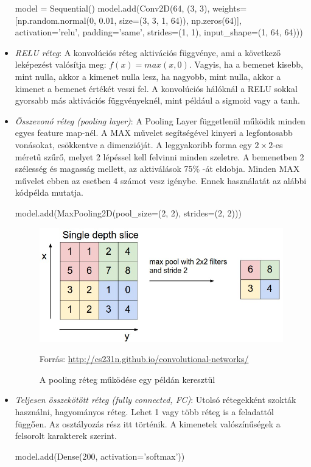 \begin{itemize}
\begin{python}
model = Sequential()
model.add(Conv2D(64, (3, 3),
	weights=[np.random.normal(0, 0.01,
	size=(3, 3, 1, 64)), np.zeros(64)],
	activation='relu', padding='same',
	strides=(1, 1),
	input_shape=(1, 64, 64)))
\end{python}

\item \textit{RELU réteg}: A konvolúciós réteg aktivációs függvénye, ami a következő leképezést valósítja meg: $f(x) = max(x, 0)$. Vagyis, ha a bemenet kisebb, mint nulla, akkor a kimenet nulla lesz, ha nagyobb, mint nulla, akkor a kimenet a bemenet értékét veszi fel. A konvolúciós hálóknál a RELU sokkal gyorsabb más aktivációs függvényeknél, mint például a sigmoid vagy a tanh.
\item \textit{Összevonó réteg (pooling layer)}: A Pooling Layer függetlenül működik minden egyes feature map-nél. A MAX művelet segítségével kinyeri a legfontosabb vonásokat, csökkentve a dimenzióját. A leggyakoribb forma egy $2 \times 2$-es méretű szűrő, melyet 2 lépéssel kell felvinni minden szeletre. A bemenetben 2 szélesség és magasság mellett, az aktiválások 75\% -át eldobja. Minden MAX művelet ebben az esetben 4 számot vesz igénybe. Ennek használatát az alábbi kódpélda mutatja.
\begin{python}
model.add(MaxPooling2D(pool_size=(2, 2), strides=(2, 2)))
\end{python}

\begin{figure}[h]
\centering
\includegraphics[scale=0.3]{images/maxpool}
\caption{A pooling réteg működése egy példán keresztül}
\label{fig:maxpool}
Forrás: \url{http://cs231n.github.io/convolutional-networks/}
\end{figure}

\item \textit{Teljesen összekötött réteg (fully connected, FC)}: Utolsó rétegekként szokták használni, hagyományos réteg. Lehet 1 vagy több réteg is a feladattól függően. Az osztályozás rész itt történik. A kimenetek valószínűségek a felsorolt karakterek szerint.
\begin{python}
model.add(Dense(200, activation='softmax'))
\end{python}
\end{itemize}

